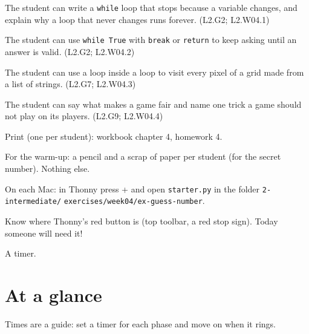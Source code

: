 
\begin{objectives}
  \item The student can write a \texttt{while} loop that stops because a variable changes, and explain why a loop that never changes runs forever. (L2.G2; L2.W04.1)
  \item The student can use \texttt{while True} with \texttt{break} or \texttt{return} to keep asking until an answer is valid. (L2.G2; L2.W04.2)
  \item The student can use a loop inside a loop to visit every pixel of a grid made from a list of strings. (L2.G7; L2.W04.3)
  \item The student can say what makes a game fair and name one trick a game should not play on its players. (L2.G9; L2.W04.4)
\end{objectives}

\begin{materials}
  \item Print (one per student): workbook chapter 4, homework 4.
  \item For the warm-up: a pencil and a scrap of paper per student (for the secret number). Nothing else.
  \item On each Mac: in Thonny press + and open \texttt{starter.py} in the folder \texttt{2-intermediate/} \texttt{exercises/week04/ex-guess-number}.
  \item Know where Thonny's red  button is (top toolbar, a red stop sign). Today someone will need it!
  \item A timer.
\end{materials}

\section{At a glance}
Times are a guide: set a timer for each phase and move on when it rings.
\begin{timeplan}
\end{timeplan}

